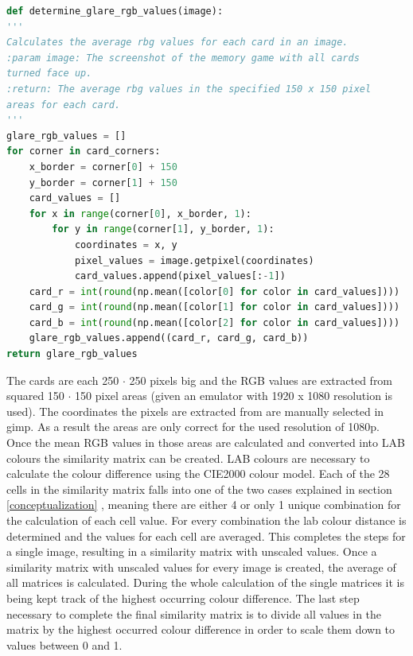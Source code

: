 \begin{lstlisting}[language=python, caption=Code for calculating the average rgb values of each card in an image., xleftmargin=5.0ex]
def determine_glare_rgb_values(image):
'''
Calculates the average rbg values for each card in an image.
:param image: The screenshot of the memory game with all cards 
turned face up.
:return: The average rbg values in the specified 150 x 150 pixel 
areas for each card. 
'''
glare_rgb_values = []
for corner in card_corners:
	x_border = corner[0] + 150
	y_border = corner[1] + 150
	card_values = []
	for x in range(corner[0], x_border, 1):
		for y in range(corner[1], y_border, 1):
			coordinates = x, y
			pixel_values = image.getpixel(coordinates)
			card_values.append(pixel_values[:-1])
	card_r = int(round(np.mean([color[0] for color in card_values])))
	card_g = int(round(np.mean([color[1] for color in card_values])))
	card_b = int(round(np.mean([color[2] for color in card_values])))
	glare_rgb_values.append((card_r, card_g, card_b))
return glare_rgb_values 
\end{lstlisting}
The cards are each 250 $\cdot$ 250 pixels big and the RGB values are extracted from squared 150 $\cdot$ 150 pixel areas (given an emulator with 1920 x 1080 resolution is used). The coordinates the pixels are extracted from are manually selected in gimp. As a result the areas are only correct for the used resolution of 1080p. Once the mean RGB values in those areas are calculated and converted into LAB colours the similarity matrix can be created. LAB colours are necessary to calculate the colour difference using the CIE2000 colour model. Each of the 28 cells in the similarity matrix falls into one of the two cases explained in section \ref{conceptualization} , meaning there are either 4 or only 1 unique combination for the calculation of each cell value. For every combination the lab colour distance is determined and the values for each cell are averaged. This completes the steps for a single image, resulting in a similarity matrix with unscaled values. 
%	
Once a similarity matrix with unscaled values for every image is created, the average of all matrices is calculated. During the whole calculation of the single matrices it is being kept track of the highest occurring colour difference. The last step necessary to complete the final similarity matrix is to divide all values in the matrix by the highest occurred colour difference in order to  scale them down to values between 0 and 1. 

